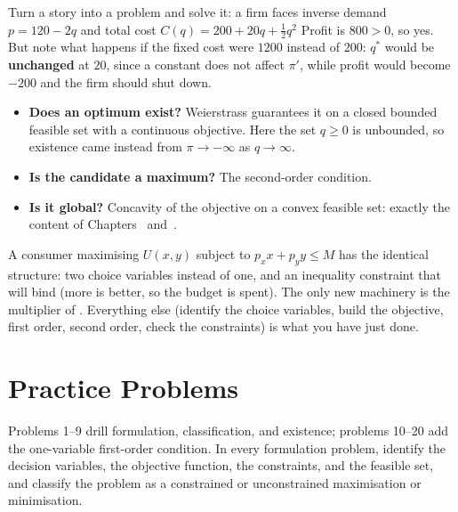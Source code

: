 \begin{worked}{Turn a story into a problem and solve it: a firm faces inverse demand $p=120-2q$ and total cost $C(q)=200+20q+\tfrac12q^{2}$}
Profit is $800>0$, so yes. But note what happens if the fixed cost were
$1200$ instead of $200$: $q^{*}$ would be \textbf{unchanged} at $20$, since
a constant does not affect $\pi'$, while profit would become $-200$ and the
firm should shut down.

\begin{itemize}[leftmargin=1.6em,itemsep=0.25ex]
  \item \textbf{Does an optimum exist?} Weierstrass guarantees it on a
        closed bounded feasible set with a continuous objective. Here the
        set $q\ge0$ is unbounded, so existence came instead from
        $\pi\to-\infty$ as $q\to\infty$.
  \item \textbf{Is the candidate a maximum?} The second-order condition.
  \item \textbf{Is it global?} Concavity of the objective on a convex
        feasible set: exactly the content of Chapters~ and~.
\end{itemize}

A consumer maximising $U(x,y)$ subject to $p_{x}x+p_{y}y\le M$ has the
identical structure: two choice variables instead of one, and an inequality
constraint that will bind (more is better, so the budget is spent). The only
new machinery is the multiplier of . Everything else (identify
the choice variables, build the objective, first order, second order, check
the constraints) is what you have just done.
\end{worked}

\section{Practice Problems}

Problems 1--9 drill formulation, classification, and existence; problems
10--20 add the one-variable first-order condition. In every formulation
problem, identify the decision variables, the objective function, the
constraints, and the feasible set, and classify the problem as a
constrained or unconstrained maximisation or minimisation.

